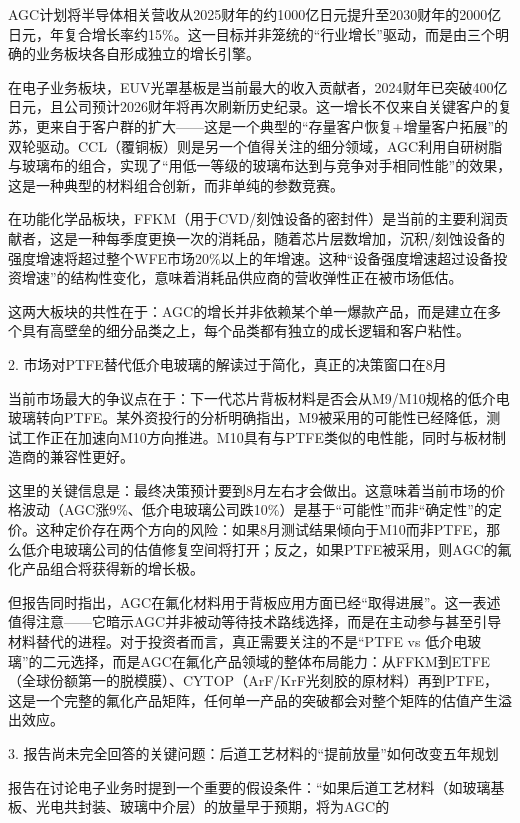 \documentclass[11pt]{ctexart}
\begin{document}
AGC计划将半导体相关营收从2025财年的约1000亿日元提升至2030财年的2000亿日元，年复合增长率约15\%。这一目标并非笼统的“行业增长”驱动，而是由三个明确的业务板块各自形成独立的增长引擎。

在电子业务板块，EUV光罩基板是当前最大的收入贡献者，2024财年已突破400亿日元，且公司预计2026财年将再次刷新历史纪录。这一增长不仅来自关键客户的复苏，更来自于客户群的扩大——这是一个典型的“存量客户恢复+增量客户拓展”的双轮驱动。CCL（覆铜板）则是另一个值得关注的细分领域，AGC利用自研树脂与玻璃布的组合，实现了“用低一等级的玻璃布达到与竞争对手相同性能”的效果，这是一种典型的材料组合创新，而非单纯的参数竞赛。

在功能化学品板块，FFKM（用于CVD/刻蚀设备的密封件）是当前的主要利润贡献者，这是一种每季度更换一次的消耗品，随着芯片层数增加，沉积/刻蚀设备的强度增速将超过整个WFE市场20\%以上的年增速。这种“设备强度增速超过设备投资增速”的结构性变化，意味着消耗品供应商的营收弹性正在被市场低估。

这两大板块的共性在于：AGC的增长并非依赖某个单一爆款产品，而是建立在多个具有高壁垒的细分品类之上，每个品类都有独立的成长逻辑和客户粘性。

2. 市场对PTFE替代低介电玻璃的解读过于简化，真正的决策窗口在8月

当前市场最大的争议点在于：下一代芯片背板材料是否会从M9/M10规格的低介电玻璃转向PTFE。某外资投行的分析明确指出，M9被采用的可能性已经降低，测试工作正在加速向M10方向推进。M10具有与PTFE类似的电性能，同时与板材制造商的兼容性更好。

这里的关键信息是：最终决策预计要到8月左右才会做出。这意味着当前市场的价格波动（AGC涨9\%、低介电玻璃公司跌10\%）是基于“可能性”而非“确定性”的定价。这种定价存在两个方向的风险：如果8月测试结果倾向于M10而非PTFE，那么低介电玻璃公司的估值修复空间将打开；反之，如果PTFE被采用，则AGC的氟化产品组合将获得新的增长极。

但报告同时指出，AGC在氟化材料用于背板应用方面已经“取得进展”。这一表述值得注意——它暗示AGC并非被动等待技术路线选择，而是在主动参与甚至引导材料替代的进程。对于投资者而言，真正需要关注的不是“PTFE vs 低介电玻璃”的二元选择，而是AGC在氟化产品领域的整体布局能力：从FFKM到ETFE（全球份额第一的脱模膜）、CYTOP（ArF/KrF光刻胶的原材料）再到PTFE，这是一个完整的氟化产品矩阵，任何单一产品的突破都会对整个矩阵的估值产生溢出效应。

3. 报告尚未完全回答的关键问题：后道工艺材料的“提前放量”如何改变五年规划

报告在讨论电子业务时提到一个重要的假设条件：“如果后道工艺材料（如玻璃基板、光电共封装、玻璃中介层）的放量早于预期，将为AGC的
\end{document}
